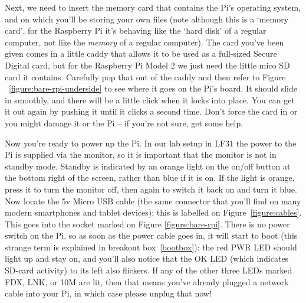 Next, we need to insert the memory card that contains the Pi's operating system, and on which you'll be storing your own files (note although this is a `memory card', for the Raspberry Pi it's behaving like the `hard disk' of a regular computer, not like the \textit{memory} of a regular computer). The card you've been given comes in a little caddy that allows it to be used as a full-sized Secure Digital card, but for the Raspberry Pi Model 2 we just need the little mico SD card it contains. Carefully pop that out of the caddy and then refer to Figure ~\ref{figure:bare-rpi-underside} to see where it goes on the Pi's board. It should slide in smoothly, and there will be a little click when it locks into place. You can get it out again by pushing it until it clicks a second time. Don't force the card in or you might damage it or the Pi -- if you're not sure, get some help.





Now you're ready to power up the Pi. In our lab setup in LF31 the power to the Pi is supplied via the monitor, so it is important that the monitor is not in standby mode. Standby is indicated by an orange light on the on/off button at the bottom right of the screen, rather than blue if it is on. If the light is orange, press it to turn the monitor off, then again to switch it back on and turn it blue. Now locate the 5v Micro USB cable (the same connector that you'll find on many modern smartphones and tablet devices); this is labelled \protect{} on Figure~\ref{figure:cables}. This goes into the socket marked  on Figure \ref{figure:bare-rpi}. There is no power switch on the Pi, so as soon as the power cable goes in, it will start to boot (this strange term is explained in breakout box~\ref{bootbox}): the red PWR LED should light up and stay on, and you'll also notice that the OK LED (which indicates SD-card activity) to its left also flickers. If any of the other three LEDs marked FDX, LNK, or 10M are lit, then that means you've already plugged a network cable into your Pi, in which case please unplug that now!




